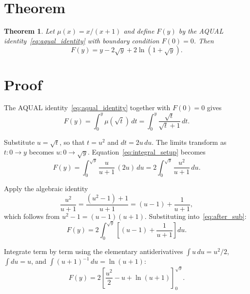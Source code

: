 \documentclass[11pt]{article}
\newtheorem{theorem}{Theorem}
\begin{document}
\section{Theorem}

\begin{theorem}
\label{thm:closed_form}
Let $\mu(x) = x/(x+1)$ and define $F(y)$ by the AQUAL
identity~\eqref{eq:aqual_identity} with boundary condition
$F(0) = 0$. Then
\begin{equation}
  \boxed{F(y) = y - 2\sqrt{y} + 2\ln(1 + \sqrt{y}).}
  \label{eq:F_closed_form}
\end{equation}
\end{theorem}

\section{Proof}

The AQUAL identity~\eqref{eq:aqual_identity} together with
$F(0) = 0$ gives
\begin{equation}
  F(y) = \int_0^y \mu(\sqrt{t})\, dt
       = \int_0^y \frac{\sqrt{t}}{\sqrt{t} + 1}\, dt.
  \label{eq:integral_setup}
\end{equation}

Substitute $u = \sqrt{t}$, so that $t = u^2$ and $dt = 2u\, du$.
The limits transform as $t: 0 \to y$ becomes $u: 0 \to \sqrt{y}$.
Equation~\eqref{eq:integral_setup} becomes
\begin{equation}
  F(y) = \int_0^{\sqrt{y}} \frac{u}{u+1}\,(2u)\, du
       = 2\int_0^{\sqrt{y}} \frac{u^2}{u+1}\, du.
  \label{eq:after_sub}
\end{equation}

Apply the algebraic identity
\begin{equation}
  \frac{u^2}{u+1} = \frac{(u^2 - 1) + 1}{u+1}
                  = (u - 1) + \frac{1}{u+1},
  \label{eq:long_division}
\end{equation}
which follows from $u^2 - 1 = (u-1)(u+1)$. Substituting
into~\eqref{eq:after_sub}:
\begin{equation}
  F(y) = 2\int_0^{\sqrt{y}}
         \left[(u - 1) + \frac{1}{u+1}\right] du.
\end{equation}

Integrate term by term using the elementary antiderivatives
$\int u\, du = u^2/2$, $\int du = u$, and
$\int (u+1)^{-1}\, du = \ln(u+1)$:
\begin{equation}
  F(y) = 2\left[\frac{u^2}{2} - u + \ln(u+1)\right]_0^{\sqrt{y}}.
\end{equation}
\end{document}
